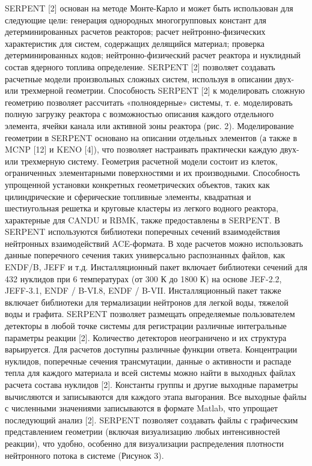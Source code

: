 SERPENT [2] основан на методе Монте-Карло и может быть использован для
следующие цели: генерация однородных многогрупповых констант для детерминированных расчетов реакторов;
расчет нейтронно-физических характеристик для систем, содержащих делящийся материал; проверка детерминированных кодов;
нейтронно-физический расчет реактора и нуклидный состав ядерного топлива
определение.
SERPENT [2] позволяет создавать расчетные модели произвольных сложных систем, используя
в описании двух- или трехмерной геометрии. Способность SERPENT [2] к
моделировать сложную геометрию позволяет рассчитать «полноядерные» системы, т. е. моделировать полную загрузку реактора с возможностью описания каждого отдельного элемента, ячейки канала или активной зоны реактора (рис. 2).
Моделирование геометрии в SERPENT основано на описании отдельных элементов (а также в MCNP [12] и KENO [4]), что позволяет настраивать практически каждую двух- или трехмерную систему. Геометрия расчетной модели состоит из клеток, ограниченных элементарными поверхностями и их производными. Способность упрощенной установки конкретных геометрических объектов, таких как цилиндрические и сферические топливные элементы, квадратная и шестиугольная решетка и круговые кластеры из легкого водного реактора, характерные для CANDU и RBMK, также предоставлены в SERPENT.
В SERPENT используются библиотеки поперечных сечений взаимодействия нейтронных взаимодействий ACE-формата. В ходе расчетов можно использовать данные поперечного сечения таких универсально распознанных файлов, как ENDF/B, JEFF и т.д. Инсталляционный пакет включает библиотеки сечений для 432 нуклидов при 6 температурах (от 300 К до 1800 К) на основе JEF-2.2, JEFF-3.1, ENDF / B-VI.8, ENDF / B-VII. Инсталляционный пакет также включает библиотеки для термализации нейтронов для легкой воды, тяжелой воды и графита.
SERPENT позволяет размещать определяемые пользователем детекторы в любой точке системы для регистрации
различные интегральные параметры реакции [2]. Количество детекторов неограничено и их структура варьируется. Для расчетов доступны различные функции ответа.
Концентрации нуклидов, поперечные сечения трансмутации, данные о активности и распаде тепла для каждого материала и всей системы можно найти в выходных файлах расчета состава нуклидов [2]. Константы группы и другие выходные параметры вычисляются и записываются для каждого этапа выгорания. Все выходные файлы с численными значениями записываются в формате Matlab, что упрощает последующий анализ [2]. SERPENT позволяет создавать файлы с графическим представлением геометрии (включая визуализацию любых интенсивностей реакции), что удобно, особенно для визуализации распределения плотности нейтронного потока в системе
(Рисунок 3).





